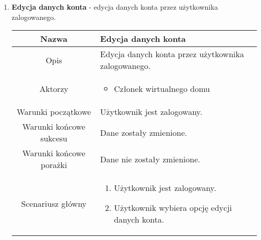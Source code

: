 \documentclass{article}
\begin{document}
\begin{enumerate}
\begin{enumerate}
			\item \textbf{Edycja danych konta} - edycja danych konta przez użytkownika
				zalogowanego.
				\begin{table}[H]
					\centering
					\begin{tabular}{|c|p{7cm}|}
						\hline
						Nazwa                   & Edycja danych konta                                                                                                                                                                                                                 \\
						\hline
						Opis                    & Edycja danych konta przez użytkownika zalogowanego.                                                                                                                                                                                 \\
						\hline
						Aktorzy                 & \begin{itemize}\item Członek wirtualnego domu\end{itemize}                                                                                                                                                                          \\
						\hline
						Warunki początkowe      & Użytkownik jest zalogowany.                                                                                                                                                                                                         \\
						\hline
						Warunki końcowe sukcesu & Dane zostały zmienione.                                                                                                                                                                                                             \\
						\hline
						Warunki końcowe porażki & Dane nie zostały zmienione.                                                                                                                                                                                                         \\
						\hline
						Scenariusz główny       & \begin{enumerate}\item Użytkownik jest zalogowany.

\item Użytkownik wybiera opcję edycji danych konta.


\end{enumerate}
\end{tabular}
\end{table}
\end{enumerate}
\end{enumerate}
\end{document}
